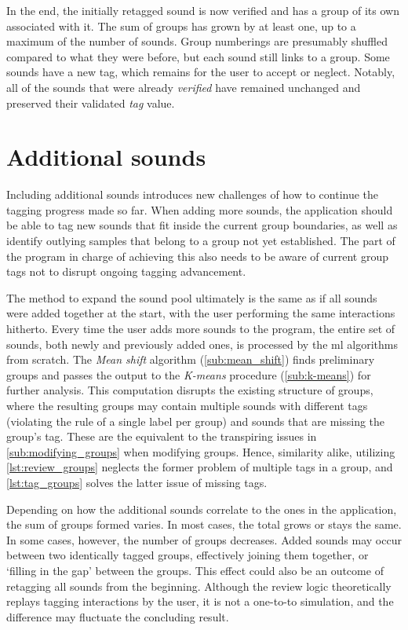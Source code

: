 In the end, the initially retagged sound is now verified and has a group of its own associated with it. The sum of groups has grown by at least one, up to a maximum of the number of sounds. Group numberings are presumably shuffled compared to what they were before, but each sound still links to a group. Some sounds have a new tag, which remains for the user to accept or neglect. Notably, all of the sounds that were already \emph{verified} have remained unchanged and preserved their validated \emph{tag} value.

\section{Additional sounds}\label{sec:additional_sounds}
Including additional sounds introduces new challenges of how to continue the tagging progress made so far. When adding more sounds, the application should be able to tag new sounds that fit inside the current group boundaries, as well as identify outlying samples that belong to a group not yet established. The part of the program in charge of achieving this also needs to be aware of current group tags not to disrupt ongoing tagging advancement.

The method to expand the sound pool ultimately is the same as if all sounds were added together at the start, with the user performing the same interactions hitherto. Every time the user adds more sounds to the program, the entire set of sounds, both newly and previously added ones, is processed by the \gls{ml} algorithms from scratch. The \emph{Mean shift} algorithm (\cref{sub:mean_shift}) finds preliminary groups and passes the output to the \emph{K-means} procedure (\cref{sub:k-means}) for further analysis. This computation disrupts the existing structure of groups, where the resulting groups may contain multiple sounds with different tags (violating the rule of a single label per group) and sounds that are missing the group's tag. These are the equivalent to the transpiring issues in \cref{sub:modifying_groups} when modifying groups. Hence, similarity alike, utilizing \cref{lst:review_groups} neglects the former problem of multiple tags in a group, and \cref{lst:tag_groups} solves the latter issue of missing tags.

Depending on how the additional sounds correlate to the ones in the application, the sum of groups formed varies. In most cases, the total grows or stays the same. In some cases, however, the number of groups decreases. Added sounds may occur between two identically tagged groups, effectively joining them together, or `filling in the gap' between the groups. This effect could also be an outcome of retagging all sounds from the beginning. Although the review logic theoretically replays tagging interactions by the user, it is not a one-to-to simulation, and the difference may fluctuate the concluding result.

\egroup{}